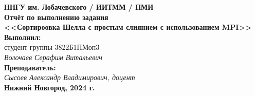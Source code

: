 \documentclass[a4paper,12pt]{article}
\begin{document}
\begin{titlepage}
    \begin{center}
        \large
        \textbf{ННГУ им. Лобачевского / ИИТММ / ПМИ}\\[0.5cm]

        \vspace{4cm}
        \textbf{\Large Отчёт по выполнению задания}\\
        \textbf{\large <<Сортироовка Шелла с простым слиянием с использованием MPI>>}\\[3cm]

        \vspace{3cm}
        \textbf{Выполнил:}\\
        студент группы 3822Б1ПМоп3 \\
        \textit{Волочаев Серафим Витальевич}\\[1cm]

        \textbf{Преподаватель:}\\
        \textit{Сысоев Александр Владимирович, доцент}\\[2cm]

        \vfill
        \textbf{Нижний Новгород, 2024 г.}
    \end{center}
\end{titlepage}
\date{\today}
\end{document}
